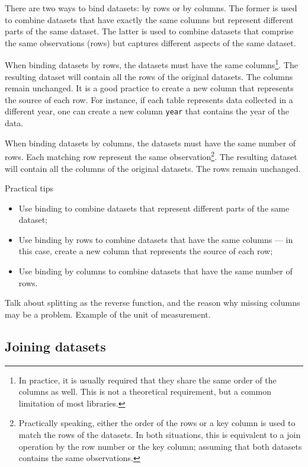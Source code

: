There are two ways to bind datasets: by rows or by columns.  The former is used to
combine datasets that have exactly the same columns but represent different parts of the
same dataset.  The latter is used to combine datasets that comprise the same observations
(rows) but captures different aspects of the same dataset.

When binding datasets by rows, the datasets must have the same columns\footnote{In
practice, it is usually required that they share the same order of the columns as well.
This is not a theoretical requirement, but a common limitation of most libraries.}.
The resulting dataset will contain all the rows of the original datasets.  The columns
remain unchanged.  It is a good practice to create a new column that represents the source
of each row.  For instance, if each table represents data collected in a different year,
one can create a new column \texttt{year} that contains the year of the data.

When binding datasets by columns, the datasets must have the same number of rows.  Each
matching row represent the same observation\footnote{Practically speaking, either the
order of the rows or a key column is used to match the rows of the datasets.  In both
situations, this is equivalent to a join operation by the row number or the key column;
assuming that both datasets contains the same observations.}. The resulting dataset will
contain all the columns of the original datasets.  The rows remain unchanged.

\begin{hlbox}{Practical tips}
  \begin{itemize}
    \item Use binding to combine datasets that represent different parts of the same dataset;
    \item Use binding by rows to combine datasets that have the same columns --- in this
      case, create a new column that represents the source of each row;
    \item Use binding by columns to combine datasets that have the same number of rows.
  \end{itemize}
\end{hlbox}

{\color{red} Talk about splitting as the reverse function, and the reason why missing
columns may be a problem. Example of the unit of measurement.}

\subsection{Joining datasets}

